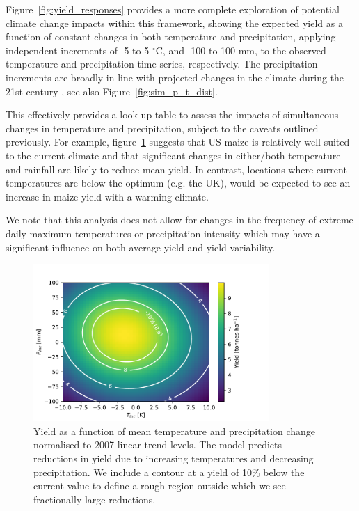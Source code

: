 \documentclass[12pt]{iopart}
\begin{document}
Figure~\ref{fig:yield_responses} provides a more complete exploration of potential climate change impacts within this framework, showing the expected yield as a function of constant changes in both temperature and precipitation, applying independent increments of -5 to 5 $^\circ$C, and -100 to 100 mm, to the observed temperature and precipitation time series, respectively. The precipitation increments are broadly in line with projected changes in the climate during the 21st century \citep{usgcrp:2017}, see also Figure~\ref{fig:sim_p_t_dist}. 

This effectively provides a look-up table to assess the impacts of simultaneous changes in temperature and precipitation, subject to the caveats outlined previously. For example, figure~\ref{fig:temp_precip_impact} suggests that US maize is relatively well-suited to the current climate and that significant changes in either/both temperature and rainfall are likely to reduce mean yield. In contrast, locations where current temperatures are below the optimum (e.g. the UK), would be expected to see an increase in maize yield with a warming climate.

We note that this analysis does not allow for changes in the frequency of extreme daily maximum temperatures or precipitation intensity which may have a significant influence on both average yield and yield variability.

\begin{figure}
\centering
\includegraphics[width=0.8\textwidth]{./figures/temp_precip_impact_contour}
\caption{\label{fig:temp_precip_impact} Yield as a function of mean temperature and precipitation change normalised to 2007 linear trend levels. The model predicts reductions in yield due to increasing temperatures and decreasing precipitation. We include a contour at a yield of 10\% below the current value to define a rough region outside which we see fractionally large reductions.}
\end{figure}
\end{document}
